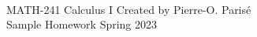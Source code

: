 \documentclass[addpoints, 12pt]{exam}%
\theoremstyle{definition}
\begin{document}
	\noindent \hrulefill \\
	MATH-241 Calculus I \hfill Created by Pierre-O. Paris{\'e}\\
	Sample Homework \hfill Spring 2023\\\vspace*{-0.7cm}
	
	\noindent\hrulefill
	
\vspace*{0.5cm}

\end{document}
